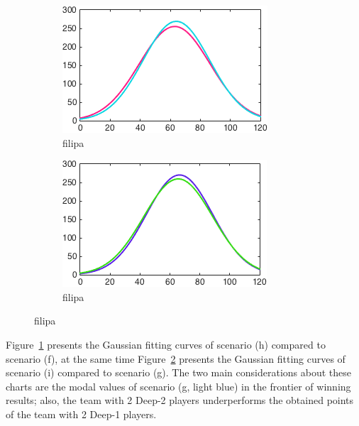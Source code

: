 \begin{figure}[h]
        \centering
        \begin{subfigure}[h]{0.4\textwidth}
                \includegraphics[width=\textwidth]{./img/4/FH}
                \caption{filipa}
                \label{fig:FH}
        \end{subfigure}
        \begin{subfigure}[h]{0.4\textwidth}
                \includegraphics[width=\textwidth]{./img/4/GI}
                \caption{filipa}
                \label{fig:GI}
        \end{subfigure}
        \caption{filipa}
        \label{fig:FGHI}
\end{figure}

Figure~\ref{fig:FH} presents the Gaussian fitting curves of scenario (h) compared to scenario (f), at the same time Figure~\ref{fig:GI} presents the Gaussian fitting curves of scenario (i) compared to scenario (g).
The two main considerations about these charts are the modal values of scenario (g, light blue) in the frontier of winning results; also, the team with 2 Deep-2 players underperforms the obtained points of the team with 2 Deep-1 players.

